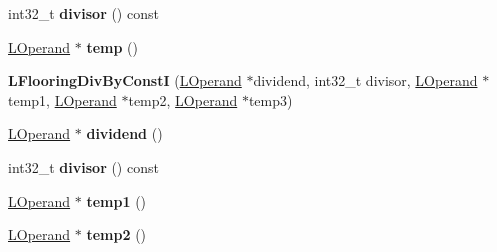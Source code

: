 \begin{DoxyCompactItemize}
\item 
int32\+\_\+t {\bfseries divisor} () const \hypertarget{classv8_1_1internal_1_1_l_flooring_div_by_const_i_af9d8b07c5bf6feee1c070b62089c5bd2}{}\label{classv8_1_1internal_1_1_l_flooring_div_by_const_i_af9d8b07c5bf6feee1c070b62089c5bd2}

\item 
\hyperlink{classv8_1_1internal_1_1_l_operand}{L\+Operand} $\ast$ {\bfseries temp} ()\hypertarget{classv8_1_1internal_1_1_l_flooring_div_by_const_i_afcfe0e19c33badfb035d72c047c00aa7}{}\label{classv8_1_1internal_1_1_l_flooring_div_by_const_i_afcfe0e19c33badfb035d72c047c00aa7}

\item 
{\bfseries L\+Flooring\+Div\+By\+ConstI} (\hyperlink{classv8_1_1internal_1_1_l_operand}{L\+Operand} $\ast$dividend, int32\+\_\+t divisor, \hyperlink{classv8_1_1internal_1_1_l_operand}{L\+Operand} $\ast$temp1, \hyperlink{classv8_1_1internal_1_1_l_operand}{L\+Operand} $\ast$temp2, \hyperlink{classv8_1_1internal_1_1_l_operand}{L\+Operand} $\ast$temp3)\hypertarget{classv8_1_1internal_1_1_l_flooring_div_by_const_i_a4bad6bad2a160ec580ee294ea5f5f221}{}\label{classv8_1_1internal_1_1_l_flooring_div_by_const_i_a4bad6bad2a160ec580ee294ea5f5f221}

\item 
\hyperlink{classv8_1_1internal_1_1_l_operand}{L\+Operand} $\ast$ {\bfseries dividend} ()\hypertarget{classv8_1_1internal_1_1_l_flooring_div_by_const_i_afd6eec483f06b84f2130f69d1bdb0663}{}\label{classv8_1_1internal_1_1_l_flooring_div_by_const_i_afd6eec483f06b84f2130f69d1bdb0663}

\item 
int32\+\_\+t {\bfseries divisor} () const \hypertarget{classv8_1_1internal_1_1_l_flooring_div_by_const_i_af9d8b07c5bf6feee1c070b62089c5bd2}{}\label{classv8_1_1internal_1_1_l_flooring_div_by_const_i_af9d8b07c5bf6feee1c070b62089c5bd2}

\item 
\hyperlink{classv8_1_1internal_1_1_l_operand}{L\+Operand} $\ast$ {\bfseries temp1} ()\hypertarget{classv8_1_1internal_1_1_l_flooring_div_by_const_i_ad723ce4b2d2a5fc051973689dc5f0fa0}{}\label{classv8_1_1internal_1_1_l_flooring_div_by_const_i_ad723ce4b2d2a5fc051973689dc5f0fa0}

\item 
\hyperlink{classv8_1_1internal_1_1_l_operand}{L\+Operand} $\ast$ {\bfseries temp2} ()\hypertarget{classv8_1_1internal_1_1_l_flooring_div_by_const_i_a8e376f93dd8ed6f99cdb3a868d5ab002}{}\label{classv8_1_1internal_1_1_l_flooring_div_by_const_i_a8e376f93dd8ed6f99cdb3a868d5ab002}


\end{DoxyCompactItemize}
